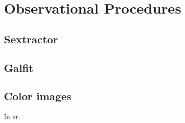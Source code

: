 
\chapter{Observational Procedures}

\section{Sextractor}

\section{Galfit}

\section{Color images}


In er.  